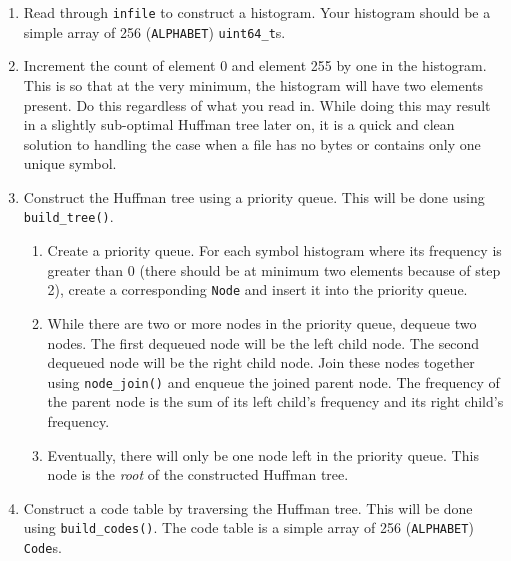 \begin{enumerate}
  \item Read through \texttt{infile} to construct a histogram. Your
    histogram should be a simple array of 256 (\texttt{ALPHABET})
    \texttt{uint64\_t}s.

  \item Increment the count of element 0 and element 255 by one in the
    histogram. This is so that at the very minimum, the histogram will
    have two elements present. Do this regardless of what you read in.
    While doing this may result in a slightly sub-optimal Huffman tree
    later on, it is a quick and clean solution to handling the case when
    a file has no bytes or contains only one unique symbol.

  \item Construct the Huffman tree using a priority queue. This will
    be done using \texttt{build\_tree()}.

    \begin{enumerate}
      \item Create a priority queue. For each symbol histogram where its
        frequency is greater than $0$ (there should be at minimum two
        elements because of step 2), create a corresponding
        \texttt{Node} and insert it into the priority queue.

      \item While there are two or more nodes in the priority queue,
        dequeue two nodes. The first dequeued node will be the left
        child node. The second dequeued node will be the right child
        node. Join these nodes together using \texttt{node\_join()} and
        enqueue the joined parent node. The frequency of the parent node
        is the sum of its left child's frequency and its right child's
        frequency.

      \item Eventually, there will only be one node left in the priority
        queue. This node is the \emph{root} of the constructed Huffman
        tree.
    \end{enumerate}

  \item Construct a code table by traversing the Huffman tree. This will
    be done using \texttt{build\_codes()}. The code table is a simple
    array of 256 (\texttt{ALPHABET}) \texttt{Code}s.


\end{enumerate}
